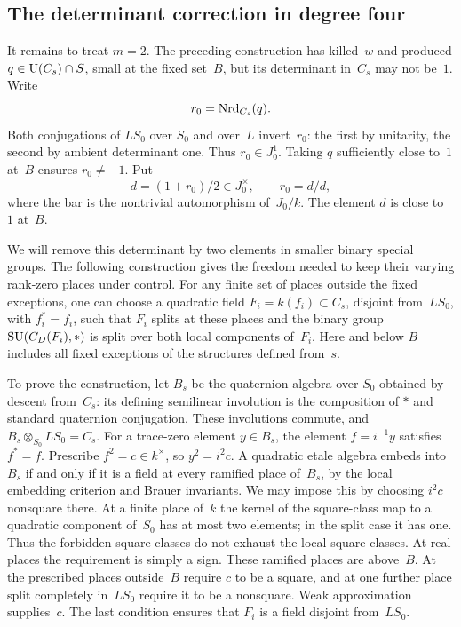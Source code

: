 \subsection{The determinant correction in degree four}

It remains to treat $m=2$.  The preceding construction has killed~$w$
and produced $q\in\operatorname{U}(C_s)\cap S$, small at the fixed set~$B$, but its
determinant in~$C_s$ may not be~$1$.  Write
\[
 r_0=\operatorname{Nrd}_{C_s}(q).
\]
Both conjugations of $LS_0$ over $S_0$ and over~$L$ invert~$r_0$:
the first by unitarity, the second by ambient determinant one.  Thus
$r_0\in J_0^1$.  Taking $q$ sufficiently close to~$1$ at~$B$ ensures
$r_0\ne-1$.  Put
\[
 d=(1+r_0)/2\in J_0^\times,\qquad r_0=d/\bar d,
\]
where the bar is the nontrivial automorphism of~$J_0/k$.  The element
$d$ is close to~$1$ at~$B$.

We will remove this determinant by two elements in smaller binary
special groups.  The following construction gives the freedom needed
to keep their varying rank-zero places under control.  For any finite
set of places outside the fixed exceptions, one can choose a
quadratic field $F_i=k(f_i)\subset C_s$, disjoint from~$LS_0$, with
$f_i^*=f_i$, such that $F_i$ splits at these places and the binary
group $\operatorname{SU}(C_D(F_i),*)$ is split over both local components of~$F_i$.
Here and below $B$ includes all fixed exceptions of the structures
defined from~$s$.

To prove the construction, let $B_s$ be the quaternion algebra over
$S_0$ obtained by descent from~$C_s$: its defining semilinear
involution is the composition of $*$ and standard quaternion
conjugation.  These involutions commute, and
$B_s\otimes_{S_0}LS_0=C_s$.  For a trace-zero element $y\in B_s$,
the element $f=i^{-1}y$ satisfies $f^*=f$.  Prescribe
$f^2=c\in k^\times$, so $y^2=i^2c$.  A quadratic etale algebra
embeds into $B_s$ if and only if it is a field at every ramified
place of~$B_s$, by the local embedding criterion and Brauer
invariants.  We may impose this by choosing $i^2c$ nonsquare there.
At a finite place of~$k$ the kernel of the square-class map to a
quadratic component of~$S_0$ has at most two elements; in the split
case it has one.  Thus the forbidden square classes do not exhaust
the local square classes.  At real places the requirement is simply
a sign.  These ramified places are above~$B$.  At the prescribed
places outside~$B$ require $c$ to be a square, and at one further
place split completely in~$LS_0$ require it to be a nonsquare.
Weak approximation supplies~$c$.  The last condition ensures that
$F_i$ is a field disjoint from~$LS_0$.

